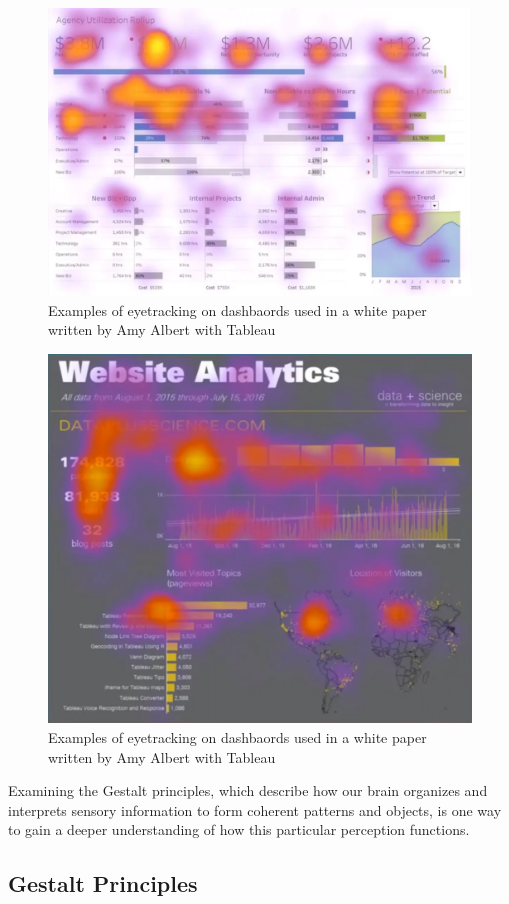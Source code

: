 \documentclass[print]{nuthesis}
\begin{document}
\begin{figure}

{\centering \includegraphics[width=0.5\linewidth]{figure/eyetracking_dashboards_f_pattern} 

}

\caption{Examples of eyetracking on dashbaords used in a white paper written by Amy Albert with Tableau}\label{fig:eyetracking-1}
\end{figure}
\begin{figure}

{\centering \includegraphics[width=0.5\linewidth]{figure/eyetracking_dashboards_z_pattern} 

}

\caption{Examples of eyetracking on dashbaords used in a white paper written by Amy Albert with Tableau}\label{fig:eyetracking-2}
\end{figure}

Examining the Gestalt principles, which describe how our brain organizes and interprets sensory information to form coherent patterns and objects, is one way to gain a deeper understanding of how this particular perception functions.

\hypertarget{gestalt-principles}{%
\subsection{Gestalt Principles}\label{gestalt-principles}}
\end{document}
